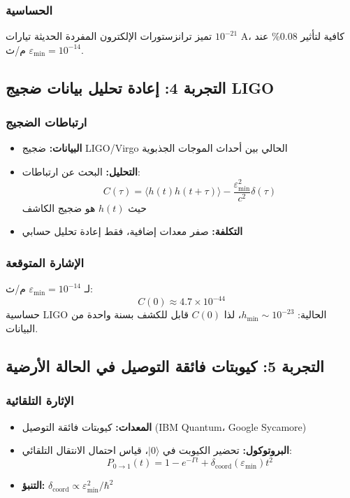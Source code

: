 \documentclass[11pt,a4paper]{article}
\begin{document}
	\subsubsection{الحساسية}
	
	تميز ترانزستورات الإلكترون المفردة الحديثة تيارات $10^{-21}$ A، كافية لتأثير 0.08\% عند $\varepsilon_{\min} = 10^{-14}$ م/ث.
	
	\subsection{التجربة 4: إعادة تحليل بيانات ضجيج LIGO}
	
	\subsubsection{ارتباطات الضجيج}
	\begin{itemize}
		\item \textbf{البيانات:} ضجيج LIGO/Virgo الحالي بين أحداث الموجات الجذبوية
		\item \textbf{التحليل:} البحث عن ارتباطات:
		\[
		C(\tau) = \langle h(t)h(t+\tau)\rangle - \frac{\varepsilon_{\min}^2}{c^2}\delta(\tau)
		\]
		حيث $h(t)$ هو ضجيج الكاشف
		\item \textbf{التكلفة:} صفر معدات إضافية، فقط إعادة تحليل حسابي
	\end{itemize}
	
	\subsubsection{الإشارة المتوقعة}
	
	لـ $\varepsilon_{\min} = 10^{-14}$ م/ث:
	\[
	C(0) \approx 4.7 \times 10^{-44}
	\]
	حساسية LIGO الحالية: $h_{\text{min}} \sim 10^{-23}$، لذا $C(0)$ قابل للكشف بسنة واحدة من البيانات.
	
	\subsection{التجربة 5: كيوبتات فائقة التوصيل في الحالة الأرضية}
	
	\subsubsection{الإثارة التلقائية}
	\begin{itemize}
		\item \textbf{المعدات:} كيوبتات فائقة التوصيل (IBM Quantum، Google Sycamore)
		\item \textbf{البروتوكول:} تحضير الكيوبت في $|0\rangle$، قياس احتمال الانتقال التلقائي:
		\[
		P_{0\to1}(t) = 1 - e^{-\Gamma t} + \delta_{\text{coord}}(\varepsilon_{\min})t^2
		\]
		\item \textbf{التنبؤ:} $\delta_{\text{coord}} \propto \varepsilon_{\min}^2/\hbar^2$
	\end{itemize}
	
\end{document}

